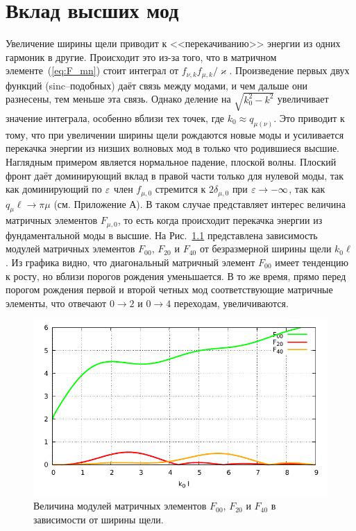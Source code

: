 \chapter{Вклад высших мод}
Увеличение ширины щели приводит к <<перекачиванию>> энергии из одних гармоник в другие. Происходит это из-за того, что в матричном элементе~(\ref{eq:F_mn}) стоит интеграл от $f_{\nu,k}f_{\mu,k}/\varkappa$. Произведение первых двух функций (sinc--подобных) даёт связь между модами, и чем дальше они разнесены, тем меньше эта связь. Однако деление на $\sqrt{k_0^2-k^2}$ увеличивает значение интеграла, особенно вблизи тех точек, где $k_0 \approx q_{\mu (\nu)}$. Это приводит к тому, что при увеличении ширины щели рождаются новые моды и усиливается перекачка энергии из низших волновых мод в только что родившиеся высшие. Наглядным примером является нормальное падение, плоской волны. Плоский фронт даёт доминирующий вклад в правой части только для нулевой моды, так как доминирующий по $\varepsilon$ член $f_{\mu,0}$ стремится к $2\delta_{\mu,0}$ при $\varepsilon \to -\infty$, так как $q_\mu \ell \to \pi \mu$ (см. Приложение А). В таком случае
представляет интерес величина матричных элементов $F_{\mu,0}$, то есть когда происходит перекачка энергии из фундаментальной моды в высшие.
На Рис.~\ref{fig:mat_el_00} представлена зависимость модулей матричных элементов $F_{00}$, $F_{20}$ и $F_{40}$ от безразмерной ширины щели $k_0 \ell$. Из графика видно, что диагональный матричный элемент $F_{00}$ имеет тенденцию к росту, но вблизи порогов рождения уменьшается. В то же время, прямо перед порогом рождения первой и второй четных мод соответствующие матричные элементы, что отвечают $0 \to 2$ и $0\to 4$ переходам, увеличиваются. 
\begin{figure}
    \centering
    \includegraphics[width = \textwidth]{figures/F00.pdf}
    \caption{Величина модулей матричных элементов $F_{00}$, $F_{20}$ и $F_{40}$ в зависимости от ширины щели.}
    \label{fig:mat_el_00}
\end{figure}

